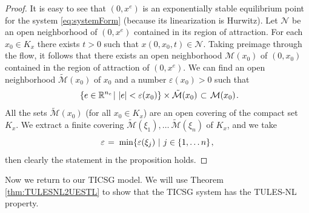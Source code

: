 \documentclass[letterpaper,10pt,conference]{ieeeconf}
\newcommand{\rline}  {{\mathbb R}}
\newcommand{\e}      {{\varepsilon}}
\newcommand{\m}      {{\hbox{\hskip 1pt}}}
\newcommand{\Mmscr}  {{\mathcal{M}}}
\newcommand{\Nmscr}  {{\mathcal{N}}}
\begin{document}
\begin{proof} It is easy to see that $(0,x^e)$ is an exponentially 
stable equilibrium point for the system \eqref{eq:systemForm} (because
its linearization is Hurwitz). Let $\Nmscr$ be an open neighborhood of
$(0,x^e)$ contained in its region of attraction. For each $x_0\in K_x$
there exists $t>0$ such that $x(0,x_0,t)\in\Nmscr$. Taking preimage
through the flow, it follows that there exists an open neighborhood
$\Mmscr(x_0)$ of $(0,x_0)$ contained in the region of attraction of
$(0,x^e)$. We can find an open neighborhood $\tilde {\Mmscr}(x_0)$ of
$x_0$ and a number $\e(x_0)>0$ such that \vspace{-2mm}
$$ \m\ \{e\in\rline^{n_e}\m|\ |e|<\e(x_0)\}\times\tilde{\Mmscr}(x_0) 
   \m\subset\m \Mmscr(x_0) \m.$$
All the sets $\tilde\Mmscr(x_0)$ (for all $x_0\in K_x$) are an open 
covering of the compact set $K_x$. We extract a finite covering 
$\tilde\Mmscr(\xi_1),\ldots\ \tilde\Mmscr(\xi_n)$ of $K_x$, and we 
take
$$\e \m=\m \min\{\e(\xi_j)\ |\ j\in\{1,\ldots n\} \m,$$
then clearly the statement in the proposition holds.
\end{proof} 

Now we return to our TICSG model. We will use Theorem
\ref{thm:TULESNL2UESTL} to show that the TICSG system has the TULES-NL
property.
\end{document}

